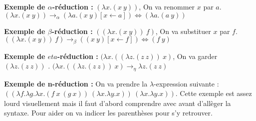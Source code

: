 \documentclass[10pt,a4paper]{article}
\begin{document}
				\textbf{Exemple de $\alpha$-réduction :} $(\lambda x.(x~y)) $, On va renommer $x$ par $a$. $(\lambda x.(x~y)) \rightarrow_{\alpha} (\lambda a.(x~y)[x \leftarrow a]) \Longleftrightarrow (\lambda a.(a~y))$ 
				\medbreak
				
				\textbf{Exemple de $\beta$-réduction :} $((\lambda x.(x~y))~f)$, On va substituer $x$ par $f$. $((\lambda x.(x~y))~f) \rightarrow_{\beta} ((x~y)[x \leftarrow f]) \Longleftrightarrow (f~y)$ 
				\medbreak
				
				\textbf{Exemple de $eta$-réduction :} $(\lambda x.((\lambda z.(z~z))~x)$, On va garder $(\lambda z.(z~z))$ . $(\lambda x.((\lambda z.(z~z))~x) \rightarrow_{\eta} \lambda z.(z~z)$ 
				\medbreak
				
				\textbf{Exemple de \textbf{n}-réduction :} On va prendre la $\lambda$-expression suivante : $((\lambda f.\lambda g.\lambda x.(f~x~(g~x))~(\lambda x.\lambda y.x))~(\lambda x.\lambda y.x))$. Cette exemple est assez lourd visuellement mais il faut d'abord comprendre avec avant d'allèger la syntaxe. Pour aider on va indicer les parenthèses pour s'y retrouver. 
				\smallbreak
				
\end{document}
